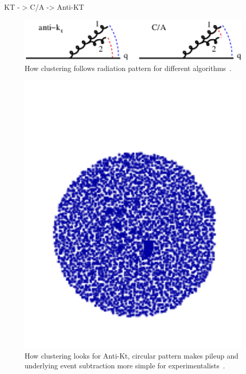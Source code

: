 
KT - > C/A -> Anti-KT
\cite{Tseng:2013dva}



\begin{figure}[htb]
\centering
\includegraphics[width=1.0\textwidth]{visuals/config-antikt-double-lund.png}
\caption{How clustering follows radiation pattern for different algorithms~\cite{Dreyer:2018nbf}.}
\label{fig:lund}
\end{figure}

\begin{figure}[htb]
\centering
\includegraphics[width=1.0\textwidth]{visuals/figs_subjet-plots-antikt.png}
\caption{How clustering looks for Anti-Kt, circular pattern makes pileup and underlying event subtraction more simple for experimentalists~\cite{Dreyer:2018nbf}.}
\label{fig:lund}
\end{figure}


